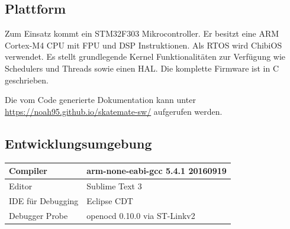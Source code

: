 \subsection*{Plattform}
Zum Einsatz kommt ein STM32F303 Mikrocontroller. Er besitzt eine ARM Cortex-M4 CPU mit FPU und DSP Instruktionen. Als RTOS wird ChibiOS verwendet. Es stellt grundlegende Kernel Funktionalitäten zur Verfügung wie Schedulers und Threads sowie einen HAL. Die komplette Firmware ist in C geschrieben.

Die vom Code generierte Dokumentation kann unter \url{https://noah95.github.io/skatemate-sw/} aufgerufen werden.
\subsection*{Entwicklungsumgebung}
\begin{center}
	\begin{tabular}{ | l | l | }
		\hline
		Compiler & arm-none-eabi-gcc 5.4.1 20160919 \\ \hline
		Editor & Sublime Text 3 \\ \hline
		IDE für Debugging & Eclipse CDT \\ \hline
		Debugger Probe & openocd 0.10.0 via ST-Linkv2 \\ \hline
	\end{tabular}
\end{center}


